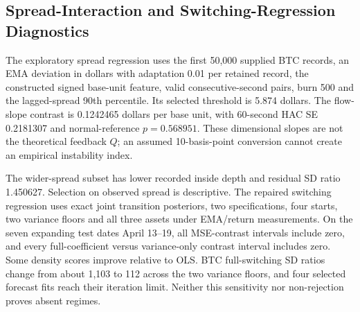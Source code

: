 \documentclass[12pt]{article}
\theoremstyle{definition}
\theoremstyle{remark}
\begin{document}
\subsection{Spread-Interaction and Switching-Regression Diagnostics}
The exploratory spread regression uses the first 50,000 supplied BTC records, an EMA deviation in dollars with adaptation 0.01 per retained record, the constructed signed base-unit feature, valid consecutive-second pairs, burn 500 and the lagged-spread 90th percentile. Its selected threshold is 5.874 dollars. The flow-slope contrast is 0.1242465 dollars per base unit, with 60-second HAC SE 0.2181307 and normal-reference $p=0.568951$. These dimensional slopes are not the theoretical feedback $Q$; an assumed 10-basis-point conversion cannot create an empirical instability index.
\begin{table}[htbp]
\centering\footnotesize\setlength{\tabcolsep}{3pt}
\caption{Exploratory BTC spread-interaction regression on the first 50,000 supplied records, with 49,497 valid transitions after burn and gap filtering. Flow is a constructed signed base-unit feature; the slope has dollars per base unit and is not the dimensionless $Q$.}
\label{tab:threshold_var}
\end{table}

The wider-spread subset has lower recorded inside depth and residual SD ratio 1.450627. Selection on observed spread is descriptive. The repaired switching regression uses exact joint transition posteriors, two specifications, four starts, two variance floors and all three assets under EMA/return measurements. On the seven expanding test dates April 13--19, all MSE-contrast intervals include zero, and every full-coefficient versus variance-only contrast interval includes zero. Some density scores improve relative to OLS. BTC full-switching SD ratios change from about 1,103 to 112 across the two variance floors, and four selected forecast fits reach their iteration limit. Neither this sensitivity nor non-rejection proves absent regimes.
\end{document}
